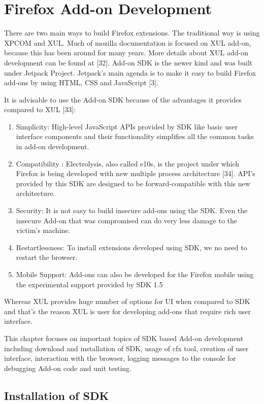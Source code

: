 \chapter{Firefox Add-on Development}

There are two main ways to build Firefox extensions. The traditional way is using XPCOM and XUL. Much of mozilla documentation is focused on XUL add-on, because this has been around for many years. More details about XUL add-on development can be found at [32]. Add-on SDK is the newer kind and was built under Jetpack Project. Jetpack's main agenda is to make it easy to build Firefox add-ons by using HTML, CSS and JavaScript [3].

It is advisable to use the Add-on SDK because of the advantages it provides compared to XUL [33]:

\begin{enumerate}
\item Simplicity: High-level JavaScript APIs provided by SDK like basic user interface components and their functionality simplifies all the common tasks in add-on development. 
\item Compatibility : Electrolysis, also called e10s, is the project under which Firefox is being developed with new multiple process architecture [34]. API's provided by this SDK are designed to be forward-compatible with this new architecture. 
\item Security: It is not easy to build insecure add-ons using the SDK. Even the insecure Add-on that was compromised can do very less damage to the victim's machine.
\item Restartlessness: To install extensions developed using SDK, we no need to restart the browser.
\item Mobile Support: Add-ons can also be developed for the Firefox mobile using the experimental support provided by SDK 1.5
\end{enumerate}

Whereas XUL provides huge number of options for UI when compared to SDK and that's the reason XUL is user for developing add-ons that require rich user interface.

This chapter focuses on important topics of SDK based Add-on development including download and installation of SDK, usage of cfx tool, creation of user interface, interaction with the browser, logging messages to the console for debugging Add-on code and unit testing.

\section{Installation of SDK}


